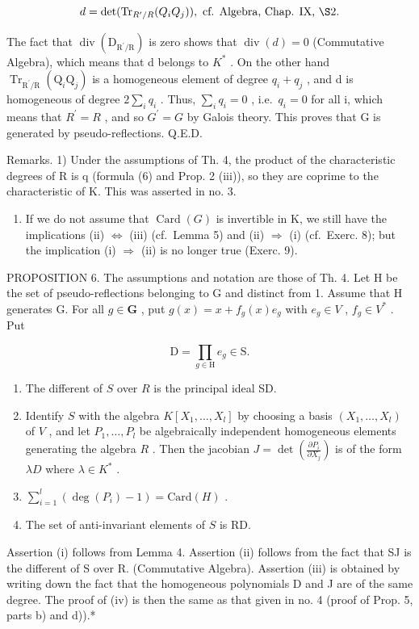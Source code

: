 \[
d = \det (\mathrm{Tr} _ {R ^ {\prime} / R} (Q _ {i} Q _ {j})), \text { cf.   Algebra,   Chap.   IX, } \S 2.
\]

The fact that \(\operatorname{div}(\mathrm{D}_{\mathrm{R}^{\prime}/\mathrm{R}})\) is zero shows that \(\operatorname{div}(d)=0\) (Commutative Algebra), which means that d belongs to \(K^{*}\) . On the other hand \(\operatorname{Tr}_{\mathrm{R}^{\prime}/\mathrm{R}}(\mathrm{Q}_{i}\mathrm{Q}_{j})\) is a homogeneous element of degree \(q_{i}+q_{j}\) , and d is homogeneous of degree \(2\sum_{i}q_{i}\) . Thus, \(\sum_{i}q_{i}=0\) , i.e.~\(q_{i}=0\) for all i, which means that \(R^{\prime}=R\) , and so \(G^{\prime}=G\) by Galois theory. This proves that G is generated by pseudo-reflections. Q.E.D.

Remarks. 1) Under the assumptions of Th. 4, the product of the characteristic degrees of R is q (formula (6) and Prop. 2 (iii)), so they are coprime to the characteristic of K. This was asserted in no. 3.

\begin{enumerate}
\def\labelenumi{\arabic{enumi})}
\setcounter{enumi}{1}
\tightlist
\item
  If we do not assume that \(\operatorname{Card}(G)\) is invertible in K, we still have the implications (ii) \(\Longleftrightarrow\) (iii) (cf.~Lemma 5) and (ii) \(\Longrightarrow\) (i) (cf.~Exerc. 8); but the implication (i) \(\Longrightarrow\) (ii) is no longer true (Exerc. 9).
\end{enumerate}

PROPOSITION 6. The assumptions and notation are those of Th. 4. Let H be the set of pseudo-reflections belonging to G and distinct from 1. Assume that H generates G. For all \(g \in \mathbf{G}\) , put \(g(x) = x + f_g(x)e_g\) with \(e_g \in V\) , \(f_g \in V^*\) . Put

\[
\mathrm{D} = \prod_ {g \in \mathrm{H}} e _ {g} \in \mathrm{S}.
\]

\begin{enumerate}
\def\labelenumi{(\roman{enumi})}
\item
  The different of \(S\) over \(R\) is the principal ideal SD.
\item
  Identify \(S\) with the algebra \(K[X_1, \ldots, X_l]\) by choosing a basis \((X_1, \ldots, X_l)\) of \(V\) , and let \(P_1, \ldots, P_l\) be algebraically independent homogeneous elements generating the algebra \(R\) . Then the jacobian \(J = \det\left(\frac{\partial P_i}{\partial X_j}\right)\) is of the form \(\lambda D\) where \(\lambda \in K^*\) .
\item
  \(\sum_{i=1}^{l} (\deg(P_i) - 1) = \text{Card}(H)\) .
\item
  The set of anti-invariant elements of \(S\) is RD.
\end{enumerate}

Assertion (i) follows from Lemma 4. Assertion (ii) follows from the fact that SJ is the different of S over R. (Commutative Algebra). Assertion (iii) is obtained by writing down the fact that the homogeneous polynomials D and J are of the same degree. The proof of (iv) is then the same as that given in no. 4 (proof of Prop. 5, parts b) and d)).*

